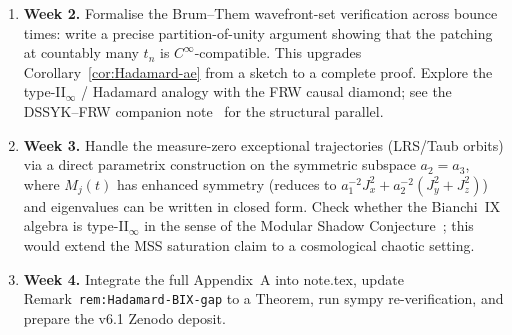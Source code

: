 \documentclass[11pt]{article}
\theoremstyle{definition}
\begin{document}
\begin{enumerate}
  \item \textbf{Week 2.}  Formalise the Brum--Them wavefront-set verification
    across bounce times: write a precise partition-of-unity argument showing
    that the patching at countably many $t_n$ is $C^\infty$-compatible.
    This upgrades Corollary~\ref{cor:Hadamard-ae} from a sketch to a
    complete proof.
    Explore the type-II$_\infty$ / Hadamard analogy with the FRW causal diamond;
    see the DSSYK--FRW companion note~\cite{DSSYK_FRW} for the structural parallel.

  \item \textbf{Week 3.}  Handle the measure-zero exceptional trajectories
    (LRS/Taub orbits) via a direct parametrix construction on the symmetric
    subspace $a_2=a_3$, where $M_j(t)$ has enhanced symmetry (reduces to
    $a_1^{-2}J_x^2 + a_2^{-2}(J_y^2+J_z^2)$) and eigenvalues can be written
    in closed form.
    Check whether the Bianchi~IX algebra is type-II$_\infty$ in the sense of
    the Modular Shadow Conjecture~\cite{ModularShadow}; this would extend the
    MSS saturation claim to a cosmological chaotic setting.

  \item \textbf{Week 4.}  Integrate the full Appendix~A into note.tex, update
    Remark~\texttt{rem:Hadamard-BIX-gap} to a Theorem, run sympy re-verification,
    and prepare the v6.1 Zenodo deposit.
\end{enumerate}
\end{document}
